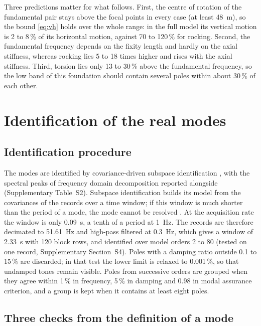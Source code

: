 \documentclass[11pt]{article}
\begin{document}
Three predictions matter for what follows. First, the centre of rotation of the fundamental pair stays above the focal points in every case (at least 48~m), so the bound \eqref{eq:vh} holds over the whole range: in the full model its vertical motion is 2 to 8\,\% of its horizontal motion, against 70 to 120\,\% for rocking. Second, the fundamental frequency depends on the fixity length and hardly on the axial stiffness, whereas rocking lies 5 to 18 times higher and rises with the axial stiffness. Third, torsion lies only 13 to 30\,\% above the fundamental frequency, so the low band of this foundation should contain several poles within about 30\,\% of each other.

\section{Identification of the real modes}
\label{sec:ident}

\subsection{Identification procedure}
\label{sec:procedure}

The modes are identified by covariance-driven subspace identification \cite{peeters1999,overschee1996}, with the spectral peaks of frequency domain decomposition \cite{brincker2001} reported alongside (Supplementary Table~S2). Subspace identification builds its model from the covariances of the records over a time window; if this window is much shorter than the period of a mode, the mode cannot be resolved \cite{priori2018}. At the acquisition rate the window is only 0.09~s, a tenth of a period at 1~Hz. The records are therefore decimated to 51.61~Hz and high-pass filtered at 0.3~Hz, which gives a window of 2.33~s with 120 block rows, and identified over model orders 2 to 80 (tested on one record, Supplementary Section~S4). Poles with a damping ratio outside 0.1 to 15\,\% are discarded; in that test the lower limit is relaxed to 0.001\,\%, so that undamped tones remain visible. Poles from successive orders are grouped when they agree within 1\,\% in frequency, 5\,\% in damping and 0.98 in modal assurance criterion, and a group is kept when it contains at least eight poles.

\subsection{Three checks from the definition of a mode}
\label{sec:checks}
\end{document}
